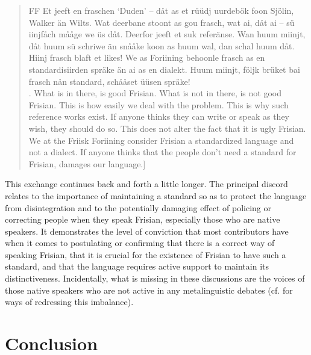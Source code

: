 \documentclass[output=paper]{langsci/langscibook}
\begin{document}
\begin{quote}
FF Et jeeft en fraschen ‘Duden’ – dåt as et rüüdj uurdebök foon Sjölin, Walker än Wilts. Wat deerbane stoont as gou frasch, wat ai, dåt ai – sü iinjfåch mååge we üs dåt. Deerfor jeeft et suk referänse. Wan huum miinjt, dåt huum sü schriwe än snååke koon as huum wal, dan schal huum dåt. Hiinj frasch blaft et likes! We as Foriining behoonle frasch as en standardisiirden spräke än ai as en dialekt. Huum miinjt, följk brüket bai frasch nån standard, schååset üüsen spräke! \bigskip\\\relax
[There is a Frisian ‘Duden’ – namely the red dictionary by Sjölin, Walker and Wilts [1988]. What is in there, is good Frisian. What is not in there, is not good Frisian. This is how easily we deal with the problem. This is why such reference works exist. If anyone thinks they can write or speak as they wish, they should do so. This does not alter the fact that it is ugly Frisian. We at the Friisk Foriining consider Frisian a standardized language and not a dialect. If anyone thinks that the people don’t need a standard for Frisian, damages our language.]
\end{quote}

This exchange continues back and forth a little longer. The principal discord relates to the importance of maintaining a standard so as to protect the language from disintegration and to the potentially damaging effect of policing or correcting people when they speak Frisian, especially those who are native speakers. It demonstrates the level of conviction that most contributors have when it comes to postulating or confirming that there is a correct way of speaking Frisian, that it is crucial for the existence of Frisian to have such a standard, and that the language requires active support to maintain its distinctiveness. Incidentally, what is missing in these discussions are the voices of those native speakers who are not active in any metalinguistic debates (cf. \citealt{AdmiraalEtAL2019} for ways of redressing this imbalance). 

\section{Conclusion}
\label{sec:gregersen:6}
\end{document}
